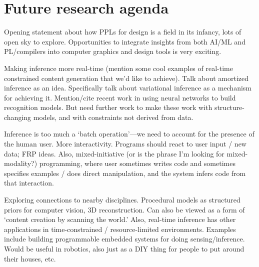 \documentclass[
10pt, %
a4paper, %
oneside, %
headinclude,footinclude, %
BCOR5mm, %
]{scrartcl}
\begin{document}
\section*{Future research agenda}

Opening statement about how PPLs for design is a field in its infancy, lots of open sky to explore. Opportunities to integrate insights from both AI/ML and PL/compilers into computer graphics and design tools is very exciting.

Making inference more real-time (mention some cool examples of real-time constrained content generation that we'd like to achieve). Talk about amortized inference as an idea. Specifically talk about variational inference as a mechanism for achieving it. Mention/cite recent work in using neural networks to build recognition models. But need further work to make these work with structure-changing models, and with constraints not derived from data.

Inference is too much a `batch operation'---we need to account for the presence of the human user. More interactivity. Programs should react to user input / new data; FRP ideas. Also, mixed-initiative (or is the phrase I'm looking for mixed-modality?) programming, where user sometimes writes code and sometimes specifies examples / does direct manipulation, and the system infers code from that interaction.

Exploring connections to nearby disciplines. Procedural models as structured priors for computer vision, 3D reconstruction. Can also be viewed as a form of `content creation by scanning the world.' Also, real-time inference has other applications in time-constrained / resource-limited environments. Examples include building programmable embedded systems for doing sensing/inference. Would be useful in robotics, also just as a DIY thing for people to put around their houses, etc.




\end{document}

